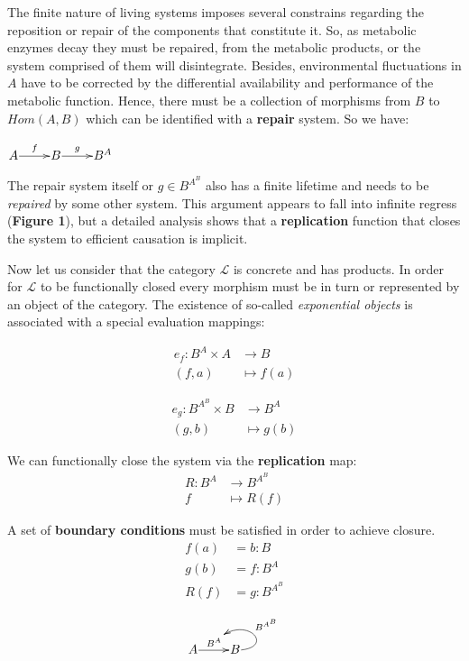 \documentclass[aps,twocolumn]{revtex4-1}
\begin{document}
The finite nature of living systems imposes several constrains regarding the reposition or repair of the components that constitute it. So, as metabolic enzymes decay they must be repaired, from the metabolic products, or the system comprised of them will disintegrate. Besides, environmental fluctuations in $A$ have to be corrected by the differential availability and performance of the metabolic function. Hence, there must be a collection of morphisms from $B$ to $Hom(A,B)$ which can be identified with a \textbf{repair} system. So we have:


\begin{center}
	$
	\xymatrix@1{
	A\ar[r]^f &B\ar[r]^-g & B^A}
	$
\end{center}


 The repair system itself or $g \in B^{A^B}$ also has a finite lifetime and needs to be {\it repaired} by some other system. 
This argument appears to fall into infinite regress (\textbf{Figure 1}), but a detailed analysis shows that a \textbf{replication} function that closes the system to efficient causation is implicit.

Now let us consider that the category $\mathcal{L}$ is concrete and has products. In order for  $\mathcal{L}$  to be  functionally closed every morphism must be in turn or represented by an object of the category. The existence of so-called {\it exponential objects} is associated with a special evaluation mappings:

\begin{align*}
e_f : B^A \times A &\longrightarrow B\\
(f,a) & \longmapsto f(a)
\end{align*}
		
\begin{align*}
			e_g: B^{A^B} \times B &\longrightarrow B^A\\
	    			            (g,b) & \longmapsto    g(b)
			\end{align*}		

We can functionally close the system via the \textbf{replication} map:
\begin{align*}
R: B^A & \longrightarrow B^{A^B}\\
f & \longmapsto R(f)
\end{align*}	
		
A set of \textbf{boundary conditions} must be satisfied in order to achieve closure.
			\begin{align*}
			f(a) &= b : B\\
			g(b) &= f : B^A\\
			R(f) &= g : B^{A^B}
			\end{align*}
\begin{center}

		$$	\xymatrix@1{
			A \ar[r]^{B^A}="ba" & B \ar@(r,ur)_(.5) {B^{A^B}} [];"ba"}$$
\end{center}
			
\end{document}
